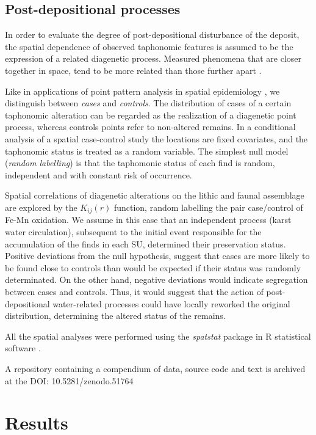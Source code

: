 \documentclass[review,authoryear]{elsarticle} %
\begin{document}
\subsection{Post-depositional processes}

In order to evaluate the degree of post-depositional disturbance of the deposit, the spatial dependence of observed taphonomic features is assumed to be the expression of a related diagenetic process. Measured phenomena that are closer together in space, tend to be more related than those further apart \citep{Tobler1970}.

Like in applications of point pattern analysis in spatial epidemiology \citep{Diggle2003,Gatrell1996}, we distinguish between \emph{cases} and \emph{controls}. The distribution of cases of a certain taphonomic alteration can be regarded as the realization of a diagenetic point process, whereas controls points refer to non-altered remains. In a conditional analysis of a spatial case-control study the locations are fixed covariates, and the taphonomic status is treated as a random variable. The simplest null model (\emph{random labelling}) is that the taphomonic status of each find is random, independent and with constant risk of occurrence.

Spatial correlations of diagenetic alterations on the lithic and faunal assemblage are explored by the $K_{ij}(r)$ function, random labelling the pair case/control of Fe-Mn oxidation. We assume in this case that an independent process (karst water circulation), subsequent to the initial event responsible for the accumulation of the finds in each SU, determined their preservation status. Positive deviations from the null hypothesis, suggest that cases are more likely to be found close to controls than would be expected if their status was randomly determinated. On the other hand, negative deviations would indicate segregation between cases and controls. Thus, it would suggest that the action of post-depositional water-related processes could have locally reworked the original distribution, determining the altered status of the remains.

All the spatial analyses were performed using the \emph{spatstat} package \citep{Baddeley2015} in \textsf{R} statistical software \citep{RCoreTeam2015}.

A repository containing a compendium of data, source code and text is archived at the DOI: 10.5281/zenodo.51764

\section{Results}
\end{document}
